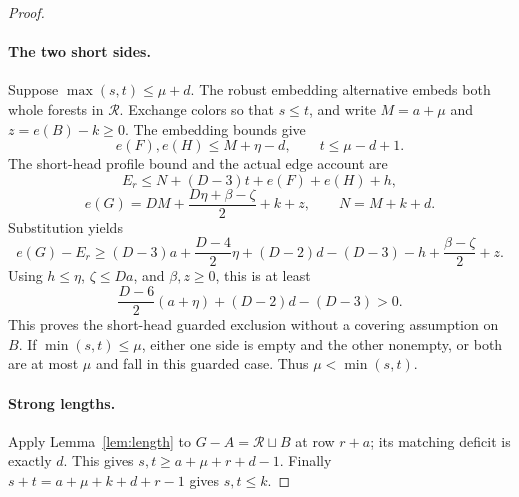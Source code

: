 \documentclass[11pt,a4paper]{article}
\theoremstyle{definition}
\begin{document}
\begin{proof}
\paragraph{The two short sides.}
Suppose $\max(s,t)\le\mu+d$.
The robust embedding alternative embeds both whole forests in
$\mathcal R$.  Exchange colors so that $s\le t$, and write
$M=a+\mu$ and $z=e(B)-k\ge0$.
The embedding bounds give
\[
 e(F),e(H)\le M+\eta-d,\qquad t\le\mu-d+1.
\]
The short-head profile bound and the actual edge account are
\[
 E_r\le N+(D-3)t+e(F)+e(H)+h,
\]
\[
 e(G)=DM+\frac{D\eta+\beta-\zeta}{2}+k+z,
 \qquad N=M+k+d.
\]
Substitution yields
\[
e(G)-E_r\ge
(D-3)a+\frac{D-4}{2}\eta+(D-2)d-(D-3)-h
 +\frac{\beta-\zeta}{2}+z.
\]
Using $h\le\eta$, $\zeta\le Da$, and $\beta,z\ge0$, this is at least
\[
 \frac{D-6}{2}(a+\eta)+(D-2)d-(D-3)>0.
\]
This proves the short-head guarded exclusion without a covering
assumption on $B$.  If $\min(s,t)\le\mu$, either one side is empty
and the other nonempty, or both are at most $\mu$ and fall in this
guarded case.  Thus $\mu<\min(s,t)$.

\paragraph{Strong lengths.}
Apply Lemma~\ref{lem:length} to
$G-A=\mathcal R\sqcup B$ at row $r+a$; its matching deficit is
exactly $d$.  This gives $s,t\ge a+\mu+r+d-1$.
Finally $s+t=a+\mu+k+d+r-1$ gives $s,t\le k$.
\end{proof}
\end{document}
